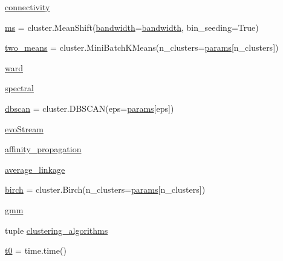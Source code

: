 \begin{DoxyCompactItemize}
\item 
\hyperlink{namespaceplot__cluster__comparison2_a90f75d217db2709f74da1dddb4e2300e}{connectivity}
\item 
\hyperlink{namespaceplot__cluster__comparison2_ae10b08159c48457c00bc78b47de6a8f6}{ms} = cluster.\+Mean\+Shift(\hyperlink{namespaceplot__cluster__comparison2_ab2526583a76a661571cb08639d3b4125}{bandwidth}=\hyperlink{namespaceplot__cluster__comparison2_ab2526583a76a661571cb08639d3b4125}{bandwidth}, bin\+\_\+seeding=True)
\item 
\hyperlink{namespaceplot__cluster__comparison2_a0d6be91876e45309a8c3923029ce490b}{two\+\_\+means} = cluster.\+Mini\+Batch\+K\+Means(n\+\_\+clusters=\hyperlink{namespaceplot__cluster__comparison2_a2c45c06ff9f589e117a4d45eca4dd71d}{params}\mbox{[}\textquotesingle{}n\+\_\+clusters\textquotesingle{}\mbox{]})
\item 
\hyperlink{namespaceplot__cluster__comparison2_a1a405b7da768fe2a548809032a917e68}{ward}
\item 
\hyperlink{namespaceplot__cluster__comparison2_a8da66fc483569b92dfd407cdb0137238}{spectral}
\item 
\hyperlink{namespaceplot__cluster__comparison2_a7047ab458a4083bd340ebb4e66f32f31}{dbscan} = cluster.\+D\+B\+S\+C\+AN(eps=\hyperlink{namespaceplot__cluster__comparison2_a2c45c06ff9f589e117a4d45eca4dd71d}{params}\mbox{[}\textquotesingle{}eps\textquotesingle{}\mbox{]})
\item 
\hyperlink{namespaceplot__cluster__comparison2_aa49ace856f840f725b12cebedadc39c9}{evo\+Stream}
\item 
\hyperlink{namespaceplot__cluster__comparison2_a1785faecb1c7f09e7d7ed7c686cc54c6}{affinity\+\_\+propagation}
\item 
\hyperlink{namespaceplot__cluster__comparison2_af43e1bcde2c70119e218519941f5ddbc}{average\+\_\+linkage}
\item 
\hyperlink{namespaceplot__cluster__comparison2_a94e74311f72a15262b0dcd321635ad44}{birch} = cluster.\+Birch(n\+\_\+clusters=\hyperlink{namespaceplot__cluster__comparison2_a2c45c06ff9f589e117a4d45eca4dd71d}{params}\mbox{[}\textquotesingle{}n\+\_\+clusters\textquotesingle{}\mbox{]})
\item 
\hyperlink{namespaceplot__cluster__comparison2_abff56dc91a3223edaf43f127fb7c600d}{gmm}
\item 
tuple \hyperlink{namespaceplot__cluster__comparison2_af9fdd0144a0e0dec73fd2d2103cbba6f}{clustering\+\_\+algorithms}
\item 
\hyperlink{namespaceplot__cluster__comparison2_a1fc27a74ae7be3d16ea1257dbb0aeb7a}{t0} = time.\+time()

\end{DoxyCompactItemize}
